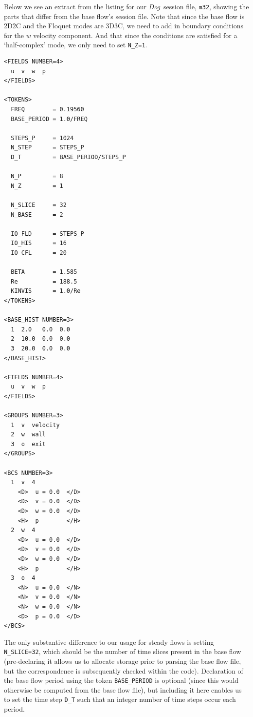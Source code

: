 \documentclass[11pt,a4paper]{report}
\newcommand{\Dog}{\emph{Dog}}
\begin{document}
Below we see an extract from the listing for our \Dog\ session file,
\verb+m32+, showing the parts that differ from the base flow's session
file.  Note that since the base flow is 2D2C and the Floquet modes are
3D3C, we need to add in boundary conditions for the $w$ velocity
component. And that since the conditions are satisfied for a
`half-complex' mode, we only need to set \verb+N_Z=1+.

{\small
\begin{verbatim}
<FIELDS NUMBER=4>
  u  v  w  p
</FIELDS>

<TOKENS>
  FREQ        = 0.19560
  BASE_PERIOD = 1.0/FREQ

  STEPS_P     = 1024
  N_STEP      = STEPS_P
  D_T         = BASE_PERIOD/STEPS_P

  N_P         = 8
  N_Z         = 1

  N_SLICE     = 32
  N_BASE      = 2

  IO_FLD      = STEPS_P
  IO_HIS      = 16
  IO_CFL      = 20

  BETA        = 1.585
  Re          = 188.5
  KINVIS      = 1.0/Re
</TOKENS>

<BASE_HIST NUMBER=3>
  1  2.0   0.0  0.0
  2  10.0  0.0  0.0
  3  20.0  0.0  0.0
</BASE_HIST>

<FIELDS NUMBER=4>
  u  v  w  p
</FIELDS>

<GROUPS NUMBER=3>
  1  v  velocity
  2  w  wall
  3  o  exit
</GROUPS>

<BCS NUMBER=3>
  1  v  4
    <D>  u = 0.0  </D>
    <D>  v = 0.0  </D>
    <D>  w = 0.0  </D>
    <H>  p        </H>
  2  w  4
    <D>  u = 0.0  </D>
    <D>  v = 0.0  </D>
    <D>  w = 0.0  </D>
    <H>  p        </H>
  3  o  4
    <N>  u = 0.0  </N>
    <N>  v = 0.0  </N>
    <N>  w = 0.0  </N>
    <D>  p = 0.0  </D>
</BCS>
\end{verbatim}
}
\noindent
The only substantive difference to our usage for steady flows is
setting \verb+N_SLICE=32+, which should be the number of time slices
present in the base flow (pre-declaring it allows us to allocate
storage prior to parsing the base flow file, but the correspondence is
subsequently checked within the code). Declaration of the base flow
period using the token \verb+BASE_PERIOD+ is optional (since this
would otherwise be computed from the base flow file), but including it
here enables us to set the time step \verb+D_T+ such that an integer
number of time steps occur each period.
\end{document}
